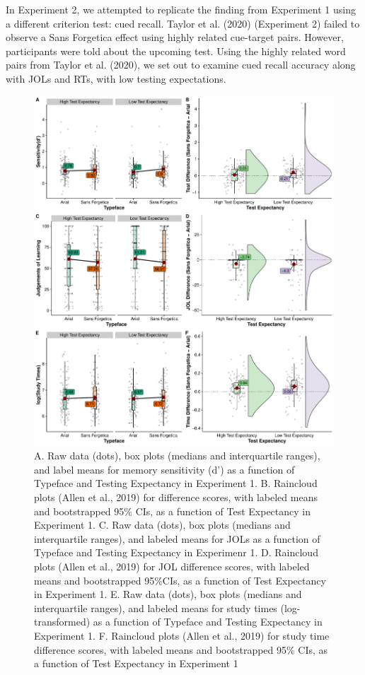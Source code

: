 \documentclass[
  english,
  jou]{apa7}
\begin{document}
In Experiment 2, we attempted to replicate the finding from Experiment 1 using a different criterion test: cued recall. Taylor et al. (2020) (Experiment 2) failed to observe a Sans Forgetica effect using highly related cue-target pairs. However, participants were told about the upcoming test. Using the highly related word pairs from Taylor et al. (2020), we set out to examine cued recall accuracy along with JOLs and RTs, with low testing expectations.

\begin{figure}

{\centering \includegraphics{Testing_Expectancy_SF_RR_files/figure-latex/unnamed-chunk-19-1} 

}

\caption{A. Raw data (dots), box plots (medians and interquartile ranges), and label means for memory sensitivity (d') as a function of Typeface and Testing Expectancy in Experiment 1. B. Raincloud plots (Allen et al., 2019) for difference scores, with labeled means and bootstrapped 95\% CIs, as a function of Test Expectancy in Experiment 1. C. Raw data (dots), box plots (medians and interquartile ranges), and labeled means for JOLs as a function of Typeface and Testing Expectancy in Experimenr 1. D. Raincloud plots (Allen et al., 2019) for JOL difference scores, with labeled means and bootstrapped 95\%CIs, as a function of Test Expectancy in Experiment 1. E. Raw data (dots), box plots (medians and interquartile ranges), and labeled means for study times (log-transformed) as a function of Typeface and Testing Expectancy in Experiment 1. F. Raincloud plots (Allen et al., 2019) for study time difference scores, with labeled means and bootstrapped 95\% CIs, as a function of Test Expectancy in Experiment 1}\label{fig:unnamed-chunk-19}
\end{figure}
\end{document}
